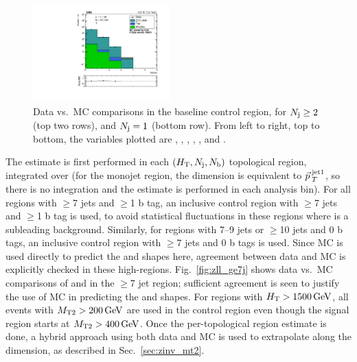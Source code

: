 \begin{figure}[htbp]
\begin{center}
    \includegraphics[width=0.47\textwidth]{figs/zinv/crdybaseJ_nBJet20.pdf}
    \caption{Data vs.\ MC comparisons in the baseline \zll control region, for $N_{\mathrm{j}}\geq2$
      (top two rows), and $N_{\mathrm{j}}=1$ (bottom row). From left to right, top to bottom, the variables
      plotted are \Ht, \mttwo, \Nj, \Nb, \Ht, and \Nb.
            }
    \label{fig:zll_crplots}
  \end{center}
\end{figure}

The \znunu estimate is first performed in each $(H_{\mathrm{T}},N_{\mathrm{j}},N_{\mathrm{b}})$ topological region, integrated
over \mttwo (for the monojet region, the \Ht dimension is equivalent to $\vec{p}_{\> T}^{\> \mathrm{jet1}}$,
so there is no integration and the estimate is performed in each analysis bin). For all regions
with $\geq$7 jets and $\geq$1 b tag, an inclusive control region with $\geq$7 jets and $\geq$1 b tag
is used, to avoid statistical fluctuations in these regions where \znunu is a subleading background.
Similarly, for regions with 7--9 jets or $\geq$10 jets and 0 b tags, an inclusive control region
with $\geq$7 jets and 0 b tags is used. Since MC is used directly to predict the \Nj and \Nb
shapes here, agreement between data and MC is explicitly checked in these high-\Nj regions.
Fig.~\ref{fig:zll_ge7j} shows data vs.\ MC comparisons of \Nj and \Nb in the $\geq$7 jet region;
sufficient agreement is seen to justify the use of MC in predicting the \Nj and \Nb shapes.
For regions with $H_{\mathrm{T}}>1500\,\text{Ge\hspace{-.08em}V}$, all events with
$M_{\mathrm{T2}}>200\,\text{Ge\hspace{-.08em}V}$ are used in the control region even though the signal region starts at $M_{\mathrm{T2}}>400\,\text{Ge\hspace{-.08em}V}$.
Once the per-topological region estimate is done, a hybrid approach using both data and MC is
used to extrapolate along the \mttwo dimension, as described in Sec.~\ref{sec:zinv_mt2}.

